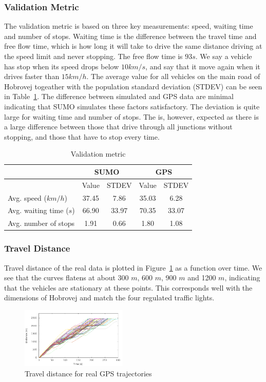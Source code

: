 \subsubsection{Validation Metric}
The validation metric is based on three key measurements: speed, waiting time and number of stops. 
Waiting time is the difference between the travel time and free flow time, which is how long it will take to drive the same distance driving at the speed limit and never stopping.
The free flow time is $93s$.
We say a vehicle has stop when its speed drops below $10km/s$, and say that it move again when it drives faster than $15km/h$.%
The average value for all vehicles on the main road of Hobrovej togeather with the population standard deviation (STDEV) can be seen in Table~\ref{table.valMetric}.
The difference between simulated and GPS data are minimal indicating that SUMO simulates these factors satisfactory.
The deviation is quite large for waiting time and number of stops.
The is, however, expected as there is a large difference between those that drive through all junctions without stopping, and those that have to stop every time.
\begin{table}
\centering
\begin{tabular}{|l|c|c|c|c|}\hline
 						&  \multicolumn{2}{c|}{SUMO} & \multicolumn{2}{c|}{GPS} \\\hline
 						& Value & STDEV & Value & STDEV \\\hline
Avg. speed ($km/h$) 	& 37.45 & 7.86 	& 35.03 & 6.28 \\\hline
Avg. waiting time ($s$) & 66.90 & 33.97 & 70.35 & 33.07 \\\hline
Avg. number of stops 	& 1.91 	& 0.66 	& 1.80 	& 1.08 \\\hline
\end{tabular}
\caption{Validation metric}\label{table.valMetric}
\end{table}

\subsubsection{Travel Distance}
Travel distance of the real data is plotted in Figure~\ref{fig:TestResults:realDistance} as a function over time. 
We see that the curves flatens at about 300 $m$, 600 $m$, 900 $m$ and 1200 $m$, indicating that the vehicles are stationary at these points.
This corresponds well with the dimensions of Hobrovej and match the four regulated traffic lights.
\begin{figure}[htb]
\includegraphics[width=0.45\textwidth]{../images/Real/RealDistance.png}
\caption{Travel distance for real GPS trajectories}
\label{fig:TestResults:realDistance}
\end{figure}

